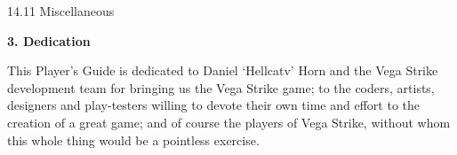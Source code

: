 \documentclass{article}
\begin{document}
14.11 Miscellaneous 



















































































































\eject \textbf{3. Dedication }

This Player's Guide is dedicated to Daniel `Hellcatv' Horn and the Vega Strike development team for bringing us the Vega Strike game; to the coders, artists, designers and play-testers willing to devote their own time and effort to the creation of a great game; and of course the players of Vega Strike, without whom this whole thing would be a pointless exercise. 
\end{document}
